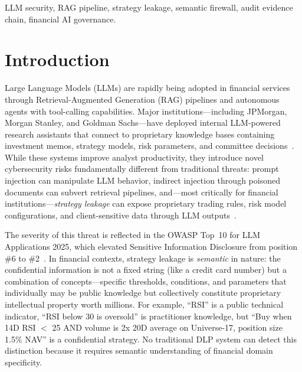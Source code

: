 \documentclass[journal,12pt,onecolumn,draftclsnofoot]{IEEEtran}
\begin{document}
\begin{IEEEkeywords}
LLM security, RAG pipeline, strategy leakage, semantic firewall, audit evidence chain, financial AI governance.
\end{IEEEkeywords}

\IEEEpeerreviewmaketitle

\section{Introduction}
\label{Sect:Introduction}

Large Language Models (LLMs) are rapidly being adopted in financial services through Retrieval-Augmented Generation (RAG) pipelines and autonomous agents with tool-calling capabilities. Major institutions---including JPMorgan, Morgan Stanley, and Goldman Sachs---have deployed internal LLM-powered research assistants that connect to proprietary knowledge bases containing investment memos, strategy models, risk parameters, and committee decisions~\cite{wsj_jpmorgan_ai, bloomberg_ms_ai, ft_gs_ai}. While these systems improve analyst productivity, they introduce novel cybersecurity risks fundamentally different from traditional threats: prompt injection can manipulate LLM behavior, indirect injection through poisoned documents can subvert retrieval pipelines, and---most critically for financial institutions---\textit{strategy leakage} can expose proprietary trading rules, risk model configurations, and client-sensitive data through LLM outputs~\cite{owasp_llm_2025}.

The severity of this threat is reflected in the OWASP Top~10 for LLM Applications 2025, which elevated Sensitive Information Disclosure from position \#6 to \#2~\cite{owasp_llm_2025}. In financial contexts, strategy leakage is \textit{semantic} in nature: the confidential information is not a fixed string (like a credit card number) but a combination of concepts---specific thresholds, conditions, and parameters that individually may be public knowledge but collectively constitute proprietary intellectual property worth millions. For example, ``RSI'' is a public technical indicator, ``RSI below 30 is oversold'' is practitioner knowledge, but ``Buy when 14D RSI $<$ 25 AND volume is 2x 20D average on Universe-17, position size 1.5\% NAV'' is a confidential strategy. No traditional DLP system can detect this distinction because it requires semantic understanding of financial domain specificity.

\end{document}
